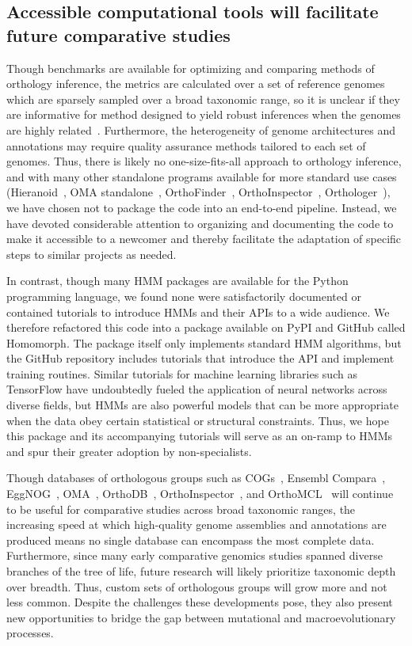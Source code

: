 \subsection{Accessible computational tools will facilitate future comparative studies}
Though benchmarks are available for optimizing and comparing methods of orthology inference, the metrics are calculated over a set of reference genomes which are sparsely sampled over a broad taxonomic range, so it is unclear if they are informative for method designed to yield robust inferences when the genomes are highly related~\cite{Nevers2022}. Furthermore, the heterogeneity of genome architectures and annotations may require quality assurance methods tailored to each set of genomes. Thus, there is likely no one-size-fits-all approach to orthology inference, and with many other standalone programs available for more standard use cases (Hieranoid~\cite{Kaduk2017}, OMA standalone~\cite{Altenhoff2019}, OrthoFinder~\cite{Emms2019}, OrthoInspector~\cite{Linard2014}, Orthologer~\cite{Zdobnov2020}), we have chosen not to package the code into an end-to-end pipeline. Instead, we have devoted considerable attention to organizing and documenting the code to make it accessible to a newcomer and thereby facilitate the adaptation of specific steps to similar projects as needed.

In contrast, though many HMM packages are available for the Python programming language, we found none were satisfactorily documented or contained tutorials to introduce HMMs and their APIs to a wide audience. We therefore refactored this code into a package available on PyPI and GitHub called Homomorph. The package itself only implements standard HMM algorithms, but the GitHub repository includes tutorials that introduce the API and implement training routines. Similar tutorials for machine learning libraries such as TensorFlow have undoubtedly fueled the application of neural networks across diverse fields, but HMMs are also powerful models that can be more appropriate when the data obey certain statistical or structural constraints. Thus, we hope this package and its accompanying tutorials will serve as an on-ramp to HMMs and spur their greater adoption by non-specialists.

Though databases of orthologous groups such as COGs~\cite{Galperin2020}, Ensembl Compara~\cite{Herrero2016}, EggNOG~\cite{HuertaCepas2018}, OMA~\cite{Altenhoff2020}, OrthoDB~\cite{Zdobnov2020}, OrthoInspector~\cite{Nevers2018}, and OrthoMCL~\cite{Chen2006} will continue to be useful for comparative studies across broad taxonomic ranges, the increasing speed at which high-quality genome assemblies and annotations are produced means no single database can encompass the most complete data. Furthermore, since many early comparative genomics studies spanned diverse branches of the tree of life, future research will likely prioritize taxonomic depth over breadth. Thus, custom sets of orthologous groups will grow more and not less common. Despite the challenges these developments pose, they also present new opportunities to bridge the gap between mutational and macroevolutionary processes.

